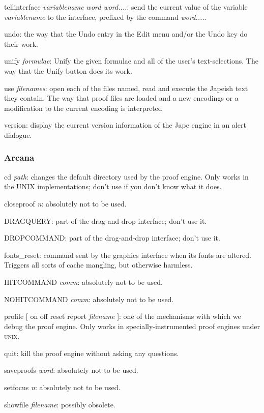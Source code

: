 tellinterface \textit{variablename word word....}: send the current value of the variable \textit{variablename} to the interface, prefixed by the command \textit{word....}.


undo: the way that the Undo entry in the Edit menu and/or the Undo key do their work.


unify \textit{formulae}: Unify the given formulae and all of the user's text-selections. The way that the Unify button does its work.


use \textit{filenames}: open each of the files named, read and execute the Japeish text they contain. The way that proof files are loaded and a new encodings or a modification to the current encoding is interpreted


version: display the current version information of the Jape engine in an alert dialogue.


\subsubsection{Arcana}


cd \textit{path}: changes the default directory used by the proof engine. Only works in the UNIX implementations; don't use if you don't know what it does.


closeproof \textit{n}: absolutely not to be used.

DRAGQUERY: part of the drag-and-drop interface; don't use it.

DROPCOMMAND: part of the drag-and-drop interface; don't use it.


fonts\_reset: command sent by the graphics interface when its fonts are altered. Triggers all sorts of cache mangling, but otherwise harmless.


HITCOMMAND \textit{comm}: absolutely not to be used.

NOHITCOMMAND \textit{comm}: absolutely not to be used.


profile [ on {\textbar} off {\textbar} reset {\textbar} report \textit{filename} ]: one of the mechanisms with which we debug the proof engine. Only works in specially-instrumented proof engines under \textsc{unix}.


quit: kill the proof engine without asking any questions.

saveproofs \textit{word}: absolutely not to be used.

setfocus \textit{n}: absolutely not to be used.

showfile \textit{filename}: possibly obsolete.

